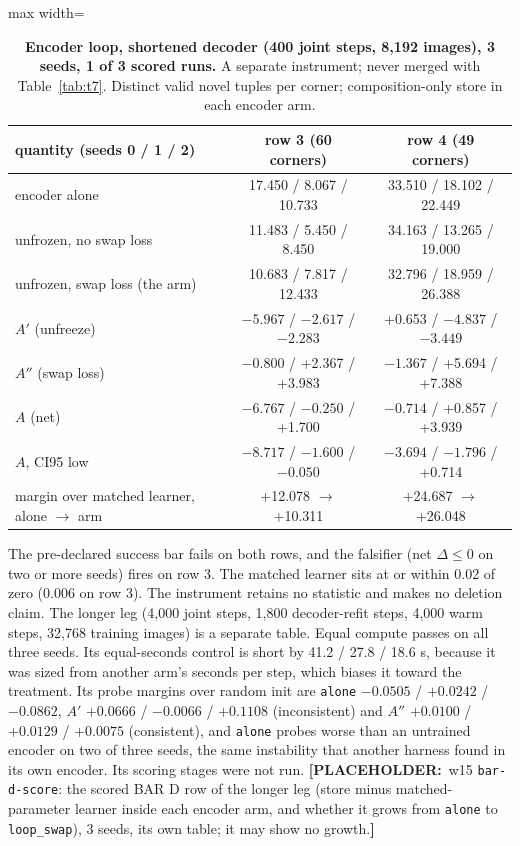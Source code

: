 \documentclass{article} %
\newcommand{\PLACEHOLDER}[1]{{\color{red}\textbf{[PLACEHOLDER:}~#1\textbf{]}}}
\begin{document}
\begin{table}[h]
\centering\small
\caption{\textbf{Encoder loop, shortened decoder (400 joint steps, 8,192 images), 3 seeds, 1 of 3 %
scored runs.} A separate instrument; never merged with Table~\ref{tab:t7}. Distinct valid novel
tuples per corner; composition-only store in each encoder arm.}
\label{tab:encloop}
\setlength{\tabcolsep}{3pt}
\begin{adjustbox}{max width=\linewidth}\begin{tabular}{lcc}
\toprule
quantity (seeds 0 / 1 / 2) & row 3 (60 corners) & row 4 (49 corners) \\ %
\midrule
encoder alone & 17.450 / 8.067 / 10.733 & 33.510 / 18.102 / 22.449 \\
unfrozen, no swap loss & 11.483 / 5.450 / 8.450 & 34.163 / 13.265 / 19.000 \\
unfrozen, swap loss (the arm) & 10.683 / 7.817 / 12.433 & 32.796 / 18.959 / 26.388 \\
$A'$ (unfreeze) & $-5.967$ / $-2.617$ / $-2.283$ & +0.653 / $-4.837$ / $-3.449$ \\
$A''$ (swap loss) & $-0.800$ / +2.367 / +3.983 & $-1.367$ / +5.694 / +7.388 \\
$A$ (net) & $-6.767$ / $-0.250$ / +1.700 & $-0.714$ / +0.857 / +3.939 \\
$A$, CI95 low & $-8.717$ / $-1.600$ / $-0.050$ & $-3.694$ / $-1.796$ / +0.714 \\
margin over matched learner, alone $\to$ arm & +12.078 $\to$ +10.311 & +24.687 $\to$ +26.048 \\
\bottomrule
\end{tabular}\end{adjustbox}
\end{table}

\noindent The pre-declared success bar fails on both rows, and the falsifier (net $\Delta\le0$ on two
or more seeds) fires on row 3. The matched learner sits at or within 0.02 of zero (0.006 on row 3).
The instrument retains no statistic and makes no deletion claim. %
The longer leg (4,000 joint steps, 1,800 decoder-refit steps, 4,000 warm steps, 32,768 training
images) is a separate table. Equal compute passes on all three seeds. Its equal-seconds control is
short by 41.2 / 27.8 / 18.6 s, because it was sized from another arm's seconds per step, which
biases it toward the treatment. Its probe margins over random init are \texttt{alone} $-0.0505$ / $+0.0242$ /
$-0.0862$, $A'$ $+0.0666$ / $-0.0066$ / $+0.1108$ (inconsistent) and $A''$ $+0.0100$ / $+0.0129$ /
$+0.0075$ (consistent), and \texttt{alone} probes worse than an untrained encoder on two of three
seeds, the same instability that another harness found in its own encoder. Its scoring stages were
not run. %
\PLACEHOLDER{w15 \texttt{bar-d-score}: the scored BAR D row of the longer leg (store minus
matched-parameter learner inside each encoder arm, and whether it grows from \texttt{alone} to
\texttt{loop\_swap}), 3 seeds, its own table; it may show no growth.}
\end{document}

